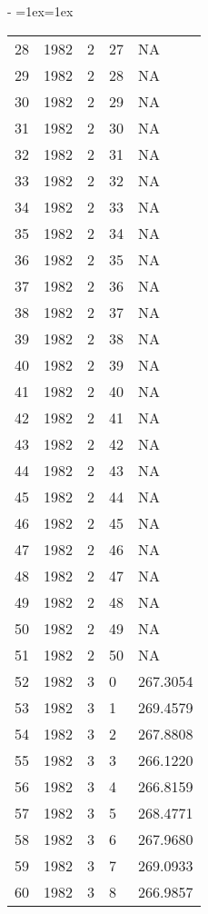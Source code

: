 \documentclass[letterpaper,10pt,english]{sphinxmanual}
\makeatletter
\newenvironment{nbsphinxfancyoutput}{%
    \let\sphinxincludegraphics\nbsphinxincludegraphics
    \nbsphinx@image@maxheight\textheight
    \advance\nbsphinx@image@maxheight -2\fboxsep   %
    \advance\nbsphinx@image@maxheight -2\fboxrule  %
    \advance\nbsphinx@image@maxheight -\baselineskip
\def\nbsphinxfcolorbox{\spx@fcolorbox{nbsphinx-code-border}{white}}%
\def\FrameCommand{\nbsphinxfcolorbox\nbsphinxfancyaddprompt\@empty}%
\def\FirstFrameCommand{\nbsphinxfcolorbox\nbsphinxfancyaddprompt\sphinxVerbatim@Continues}%
\def\MidFrameCommand{\nbsphinxfcolorbox\sphinxVerbatim@Continued\sphinxVerbatim@Continues}%
\def\LastFrameCommand{\nbsphinxfcolorbox\sphinxVerbatim@Continued\@empty}%
\MakeFramed{\advance\hsize-\width\@totalleftmargin\z@\linewidth\hsize\@setminipage}%
\lineskip=1ex\lineskiplimit=1ex\raggedright%
}{\par\unskip\@minipagefalse\endMakeFramed}
\def\nbsphinxfancyaddprompt{\ifvoid\nbsphinxpromptbox\else
    \kern\fboxrule\kern\fboxsep
    \copy\nbsphinxpromptbox
    \kern-\ht\nbsphinxpromptbox\kern-\dp\nbsphinxpromptbox
    \kern-\fboxsep\kern-\fboxrule\nointerlineskip
    \fi}
\newcommand*{\nbsphinxincludegraphics}[2][]{%
    \gdef\spx@includegraphics@options{#1}%
    \setbox\spx@image@box\hbox{\texttt{[image: \#2]}}%
    \in@false
    \ifdim \wd\spx@image@box>\linewidth
      \g@addto@macro\spx@includegraphics@options{,width=\linewidth}%
      \in@true
    \fi
    \ifdim \ht\spx@image@box>\nbsphinx@image@maxheight
      \g@addto@macro\spx@includegraphics@options{,height=\nbsphinx@image@maxheight}%
      \in@true
    \fi
    \ifin@
      \g@addto@macro\spx@includegraphics@options{,keepaspectratio}%
    \fi
    \setbox\spx@image@box\box\voidb@x %
    \expandafter\includegraphics\expandafter[\spx@includegraphics@options]{#2}%
}%
\makeatother
\begin{document}
\begin{nbsphinxfancyoutput}
\begin{tabular}{r|llll}
    28 & 1982 & 2 & 27 &       NA\\
    29 & 1982 & 2 & 28 &       NA\\
    30 & 1982 & 2 & 29 &       NA\\
    31 & 1982 & 2 & 30 &       NA\\
    32 & 1982 & 2 & 31 &       NA\\
    33 & 1982 & 2 & 32 &       NA\\
    34 & 1982 & 2 & 33 &       NA\\
    35 & 1982 & 2 & 34 &       NA\\
    36 & 1982 & 2 & 35 &       NA\\
    37 & 1982 & 2 & 36 &       NA\\
    38 & 1982 & 2 & 37 &       NA\\
    39 & 1982 & 2 & 38 &       NA\\
    40 & 1982 & 2 & 39 &       NA\\
    41 & 1982 & 2 & 40 &       NA\\
    42 & 1982 & 2 & 41 &       NA\\
    43 & 1982 & 2 & 42 &       NA\\
    44 & 1982 & 2 & 43 &       NA\\
    45 & 1982 & 2 & 44 &       NA\\
    46 & 1982 & 2 & 45 &       NA\\
    47 & 1982 & 2 & 46 &       NA\\
    48 & 1982 & 2 & 47 &       NA\\
    49 & 1982 & 2 & 48 &       NA\\
    50 & 1982 & 2 & 49 &       NA\\
    51 & 1982 & 2 & 50 &       NA\\
    52 & 1982 & 3 &  0 & 267.3054\\
    53 & 1982 & 3 &  1 & 269.4579\\
    54 & 1982 & 3 &  2 & 267.8808\\
    55 & 1982 & 3 &  3 & 266.1220\\
    56 & 1982 & 3 &  4 & 266.8159\\
    57 & 1982 & 3 &  5 & 268.4771\\
    58 & 1982 & 3 &  6 & 267.9680\\
    59 & 1982 & 3 &  7 & 269.0933\\
    60 & 1982 & 3 &  8 & 266.9857\\
\end{tabular}
\end{nbsphinxfancyoutput}
\end{document}

